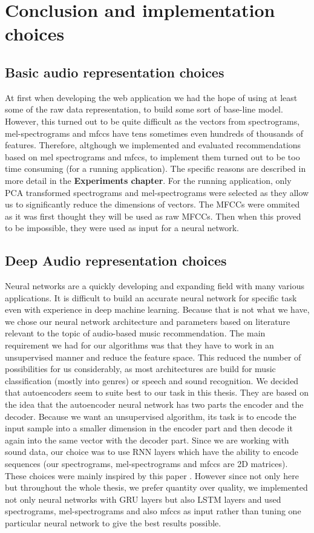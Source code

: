 \section{Conclusion and implementation choices}

\subsection{Basic audio representation choices}
At first when developing the web application we had the hope of using at least some of the raw data representation, to build some sort of base-line model. However, this turned out to be quite difficult as the vectors from spectrograms, mel-spectrograms and mfccs have tens sometimes even hundreds of thousands of features. Therefore, altghough we implemented and evaluated recommendations based on mel spectrograms and mfccs, to implement them turned out to be too time consuming (for a running application). The specific reasons are described in more detail in the \textbf{Experiments chapter}. For the running application, only PCA transformed spectrograms and mel-spectrograms were selected as they allow us to significantly reduce the dimensions of vectors. The MFCCs were ommited as it was first thought they will be used as raw MFCCs. Then when this proved to be impossible, they were used as input for a neural network.

\subsection{Deep Audio representation choices}
Neural networks are a quickly developing and expanding field with many various applications. It is difficult to build an accurate neural network for specific task even with experience in deep machine learning. Because that is not what we have, we chose our neural network architecture and parameters based on literature relevant to the topic of audio-based music recommendation. The main requirement we had for our algorithms was that they have to work in an unsupervised manner and reduce the feature space. This reduced the number of possibilities for us considerably, as most architectures are build for music classification (mostly into genres) or speech and sound recognition. We decided that autoencoders seem to suite best to our task in this thesis. They are based on the idea that the autoencoder neural network has two parts the encoder and the decoder. Because we want an unsupervised algorithm, its task is to encode the input sample into a smaller dimension in the encoder part and then decode it again into the same vector with the decoder part. Since we are working with sound data, our choice was to use RNN layers which have the ability to encode sequences (our spectrograms, mel-spectrograms and mfccs are 2D matrices). These choices were mainly inspired by this paper \cite{inproceedings_RNNs}. However since not only here but throughout the whole thesis, we prefer quantity over quality, we implemented not only neural networks with GRU layers but also LSTM layers and used spectrograms, mel-spectrograms and also mfccs as input rather than tuning one particular neural network to give the best results possible. 